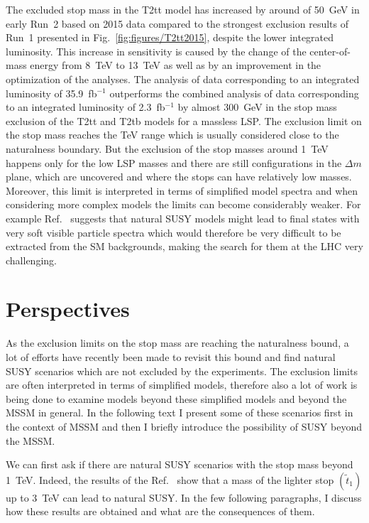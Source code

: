 The excluded stop mass in the T2tt model has increased by around of 50~GeV in early Run~2 based on 2015 data compared to the strongest exclusion results of Run~1 presented in Fig.~\ref{fig:figures/T2tt2015}, despite the lower integrated luminosity. This increase in sensitivity is caused by the change of the center-of-mass energy from 8~TeV to 13~TeV as well as by an improvement in the optimization of the analyses. The analysis of data corresponding to an integrated luminosity of 35.9~fb$^{-1}$ outperforms the combined analysis of data corresponding to an integrated luminosity of 2.3~fb$^{-1}$ by almost 300~GeV in the stop mass exclusion of the T2tt and T2tb models for a massless LSP. The exclusion limit on the stop mass reaches the TeV range which is usually considered close to the naturalness boundary. But the exclusion of the stop masses around 1~TeV happens only for the low LSP masses and there are still configurations in the $\Delta m$ plane, which are uncovered and where the stops can have relatively low masses. Moreover, this limit is interpreted in terms of simplified model spectra and when considering more complex models the limits can become considerably weaker. For example Ref.~\cite{Baer:2012uy} suggests that natural SUSY models might lead to final states with very soft visible particle spectra which would therefore be very difficult to be extracted from the SM backgrounds, making the search for them at the LHC very challenging.%


\newpage

\section{Perspectives}

As the exclusion limits on the stop mass are reaching the naturalness bound, a lot of efforts have  recently been made to revisit this bound and find natural SUSY scenarios which are not excluded by the experiments. The exclusion limits are often interpreted in terms of simplified models, therefore also a lot of work is being done to examine models beyond these simplified models and beyond the MSSM in general. In the following text I present some of these scenarios first in the context of MSSM and then I briefly introduce the possibility of SUSY beyond the MSSM.

We can first ask if there are natural SUSY scenarios with the stop mass beyond 1~TeV. Indeed, the results of the Ref.~\cite{Baer:2016bwh} show that a mass of the lighter stop $(\tilde{t}_{1})$  up to 3~TeV can lead to natural SUSY. In the few following paragraphs, I discuss how these results are obtained and what are the consequences of them.

